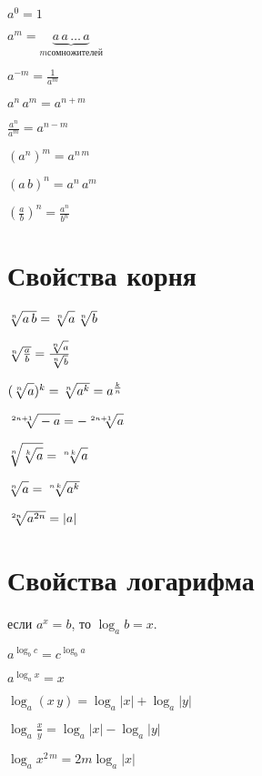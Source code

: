 $ a^0 = 1 $

$ a^m = \underbrace{a\, a \, \ldots \, a }_{m сомножителей} $

$ a^{-m} = \frac{1}{a^m} $

$ a^n\, a^m = a^{n+m} $

$ \frac{a^n}{a^m} = a^{n-m} $

$ (a^n)^m = a^{n\, m} $

$ (a\, b)^n = a^n\, a^m $

$ \left(\frac{a}{b} \right)^n = \frac{a^n}{b^n} $


\section{Свойства корня}

$ \sqrt[n]{\mathstrut a\, b} = \sqrt[n]{\mathstrut a} \, \sqrt[n]{\mathstrut b} $

$ \sqrt[n]{\mathstrut \frac{a}{b}} = \frac{\sqrt[n]{\mathstrut a}}{\sqrt[n]{\mathstrut b}} $

$ (\sqrt[n]{\mathstrut a})^k = \sqrt[n]{\mathstrut a^k} = a^{\frac{k}{n}} $

$ \sqrt[2n + 1]{\mathstrut -a} = -\sqrt[2n + 1]{\mathstrut a} $

$ \sqrt[n]{\mathstrut \sqrt[k]{\mathstrut a}} = \sqrt[n\, k]{\mathstrut a} $

$ \sqrt[n]{\mathstrut a} = \sqrt[n\, k]{\mathstrut a^k} $

$ \sqrt[2n]{\mathstrut a^{2n}} = |a| $


\section{Свойства логарифма}

\begin{center}
	если $ a^x = b $, то $ \log_a b = x $.
\end{center}

$ a^{\log_b c} = c^{\log_b a} $

$ a^{\log_a x} = x $

$ \log_a (x\, y) = \log_a |x| + \log_a |y| $

$ \log_a \frac{x}{y} = \log_a |x| - \log_a |y| $

$ \log_a x^{2\, m} = 2m \log_a |x| $

